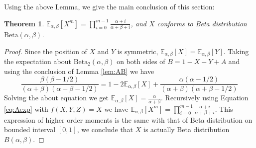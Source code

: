 \documentclass[review,authoryear]{elsarticle}
\def\E{\mathbb{E}}
\def\Beta{\textrm{Beta}}
\newtheorem{theorem}{Theorem}
\begin{document}
Using the above Lemma, we give the main conclusion of this section:
\begin{theorem}\label{thm:Xm}
	$\E_{\alpha, \beta}[X^m] =
	\prod_{i=0}^{m-1}\frac{\alpha+i}{\alpha+\beta+i}$, and $X$
	conforms to Beta distribution $\Beta(\alpha, \beta)$.
\end{theorem}
\begin{proof}
	Since the position of $X$ and $Y$ is symmetric,
	$\E_{\alpha, \beta}[X]=\E_{\alpha, \beta}[Y]$.
	Taking the expectation about $\Beta_2(\alpha, \beta)$
	on both sides of $B=1-X-Y+A$ and using the
	conclusion of Lemma \ref{lem:AB} we have
	\begin{equation*}
	\frac{\beta(\beta-1/2)}{(\alpha+\beta)(\alpha+\beta-1/2)}
	= 1 - 2\E_{\alpha, \beta}[X] +
	\frac{\alpha(\alpha-1/2)}{(\alpha+\beta)(\alpha+\beta-1/2)}
	\end{equation*}
	Solving the about equation we get
	$\E_{\alpha, \beta}[X]=\frac{\alpha}{\alpha + \beta}$.
	Recursively using Equation \eqref{eq:Aexp} with $f(X,Y,Z)=X$
	we have $\E_{\alpha, \beta}[X^m] =
	\prod_{i=0}^{m-1}\frac{\alpha+i}{\alpha+\beta+i}$.
	This expression of higher order moments
	is the same with that of Beta distribution on bounded interval $[0,1]$, we
	conclude that $X$ is actually Beta distribution $B(\alpha,
	\beta)$.
\end{proof}
\end{document}
